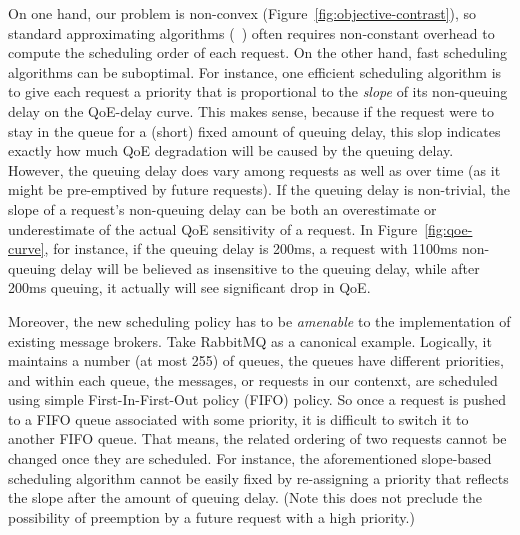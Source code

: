 On one hand, our problem is non-convex (Figure~\ref{fig:objective-contrast}), so standard approximating
algorithms (\eg~\cite{udell2013maximizing}) often requires non-constant overhead to compute the scheduling order of each request. 
On the other hand, fast scheduling algorithms can be suboptimal. 
For instance, one efficient scheduling algorithm is to give each request a priority that is proportional to the {\em slope} of its non-queuing delay on the QoE-delay curve. 
This makes sense, because if the request were to stay in the queue for a (short) fixed amount of queuing delay, this slop indicates exactly how much QoE degradation will be caused by the queuing delay. %
However, the queuing delay does vary among requests as well as over time (as it might be pre-emptived by future requests). %
If the queuing delay is non-trivial, the slope of a request's non-queuing delay can be both an overestimate or underestimate of the actual QoE sensitivity of a request. 
In Figure~\ref{fig:qoe-curve}, for instance, if the queuing delay is 200ms, a request with 1100ms non-queuing delay will be believed as insensitive to the queuing delay, while after 200ms queuing, it actually will see significant drop in QoE. 


Moreover, the new scheduling policy has to be {\em amenable} to the implementation of existing message brokers. 
Take RabbitMQ as a canonical example. 
Logically, it maintains a number (at most 255) of queues, the queues have different priorities, and within each queue, the messages, or requests in our contenxt, are scheduled using simple First-In-First-Out policy (FIFO) policy.
So once a request is pushed to a FIFO queue associated with some priority, it is difficult to switch it to another FIFO queue. 
That means, the related ordering of two requests cannot be changed once they are scheduled.
For instance, the aforementioned slope-based scheduling algorithm cannot be easily fixed by re-assigning a priority that reflects the slope after the amount of queuing delay.
(Note this does not preclude the possibility of preemption by a future request with a high priority.)


